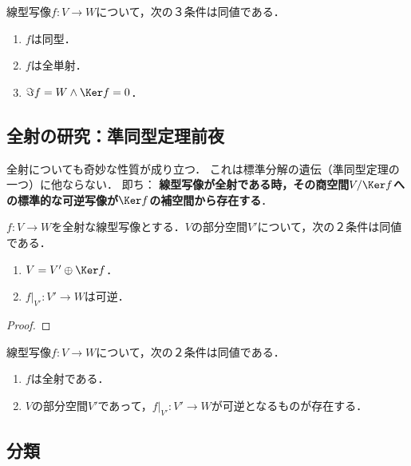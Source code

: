 \documentclass[uplatex, dvipdfmx]{jsreport}
\begin{document}
\begin{corollary}[可逆性と全単射は同値]\label{cor-invertible-if-全単射}
    線型写像$f:V\to W$について，次の３条件は同値である．
    \begin{enumerate}
        \item $f$は同型．
        \item $f$は全単射．
        \item $\Im f=W\land\Ker f=0$．
    \end{enumerate}
\end{corollary}

\subsection{全射の研究：準同型定理前夜}

\begin{tcolorbox}[colframe=ForestGreen, colback=ForestGreen!10!white, breakable]
    全射についても奇妙な性質が成り立つ．
    これは標準分解の遺伝（準同型定理の一つ）に他ならない．
    即ち：
    \textbf{線型写像が全射である時，その商空間$V/\Ker f$への標準的な可逆写像が$\Ker f$の補空間から存在する}．
\end{tcolorbox}

\begin{proposition}[準同型定理へ向けて]\label{prop-pre-homomorphism-thm}
    $f:V\to W$を全射な線型写像とする．$V$の部分空間$V'$について，次の２条件は同値である．
    \begin{enumerate}
        \item $V=V'\oplus\Ker f$．
        \item $f|_{V'}:V'\to W$は可逆．
    \end{enumerate}
\end{proposition}
\begin{proof}
    
\end{proof}

\begin{corollary}
    線型写像$f:V\to W$について，次の２条件は同値である．
    \begin{enumerate}
        \item $f$は全射である．
        \item $V$の部分空間$V'$であって，$f|_{V'}:V'\to W$が可逆となるものが存在する．
    \end{enumerate}
\end{corollary}

\subsection{分類}
\end{document}
